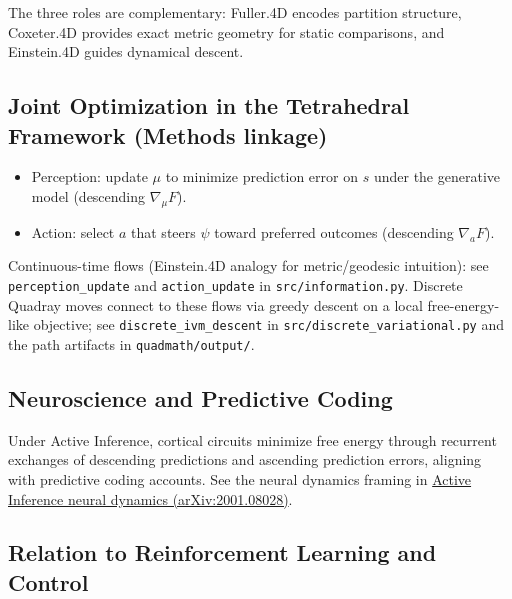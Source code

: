 \documentclass[
  10pt,
]{article}
\providecommand{\tightlist}{%
  \setlength{\itemsep}{0pt}\setlength{\parskip}{0pt}}
\begin{document}
The three roles are complementary: Fuller.4D encodes partition
structure, Coxeter.4D provides exact metric geometry for static
comparisons, and Einstein.4D guides dynamical descent.

\hypertarget{joint-optimization-in-the-tetrahedral-framework-methods-linkage}{%
\subsection{Joint Optimization in the Tetrahedral Framework (Methods
linkage)}\label{joint-optimization-in-the-tetrahedral-framework-methods-linkage}}

\begin{itemize}
\tightlist
\item
  Perception: update \(\mu\) to minimize prediction error on \(s\) under
  the generative model (descending \(\nabla_{\mu} F\)).
\item
  Action: select \(a\) that steers \(\psi\) toward preferred outcomes
  (descending \(\nabla_{a} F\)).
\end{itemize}

Continuous-time flows (Einstein.4D analogy for metric/geodesic
intuition): see \texttt{perception\_update} and \texttt{action\_update}
in \texttt{src/information.py}. Discrete Quadray moves connect to these
flows via greedy descent on a local free-energy-like objective; see
\texttt{discrete\_ivm\_descent} in \texttt{src/discrete\_variational.py}
and the path artifacts in \texttt{quadmath/output/}.

\hypertarget{neuroscience-and-predictive-coding}{%
\subsection{Neuroscience and Predictive
Coding}\label{neuroscience-and-predictive-coding}}

Under Active Inference, cortical circuits minimize free energy through
recurrent exchanges of descending predictions and ascending prediction
errors, aligning with predictive coding accounts. See the neural
dynamics framing in \href{https://arxiv.org/abs/2001.08028}{Active
Inference neural dynamics (arXiv:2001.08028)}.

\hypertarget{relation-to-reinforcement-learning-and-control}{%
\subsection{Relation to Reinforcement Learning and
Control}\label{relation-to-reinforcement-learning-and-control}}
\end{document}
